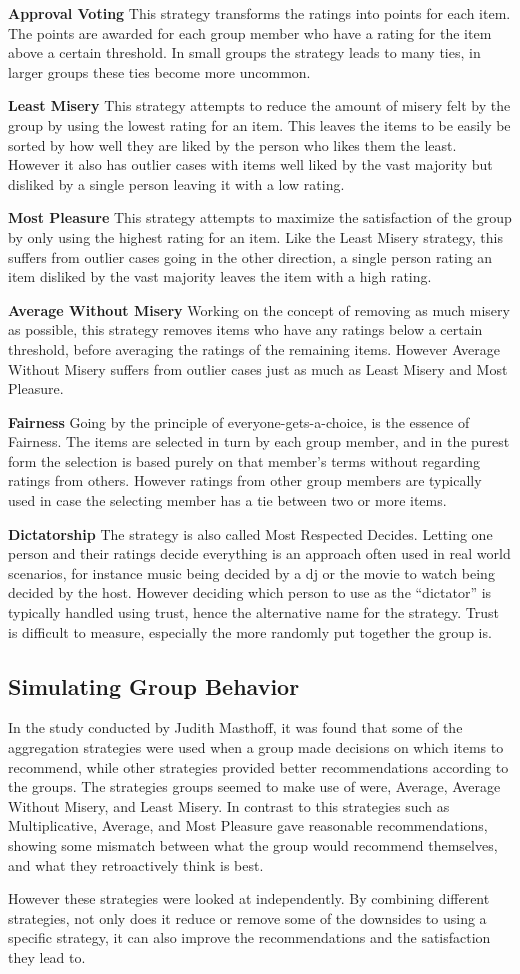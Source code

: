 \textbf{Approval Voting}
This strategy transforms the ratings into points for each item. The points are awarded for each group member who have a rating for the item above a certain threshold. In small groups the strategy leads to many ties, in larger groups these ties become more uncommon.

\textbf{Least Misery}
This strategy attempts to reduce the amount of misery felt by the group by using the lowest rating for an item. This leaves the items to be easily be sorted by how well they are liked by the person who likes them the least. However it also has outlier cases with items well liked by the vast majority but disliked by a single person leaving it with a low rating.

\textbf{Most Pleasure}
This strategy attempts to maximize the satisfaction of the group by only using the highest rating for an item. Like the Least Misery strategy, this suffers from outlier cases going in the other direction, a single person rating an item disliked by the vast majority leaves the item with a high rating.

\textbf{Average Without Misery}
Working on the concept of removing as much misery as possible, this strategy removes items who have any ratings below a certain threshold, before averaging the ratings of the remaining items. However Average Without Misery suffers from outlier cases just as much as Least Misery and Most Pleasure.

\textbf{Fairness}
Going by the principle of everyone-gets-a-choice, is the essence of Fairness. The items are selected in turn by each group member, and in the purest form the selection is based purely on that member's terms without regarding ratings from others. However ratings from other group members are typically used in case the selecting member has a tie between two or more items. 

\textbf{Dictatorship}
The strategy is also called Most Respected Decides. Letting one person and their ratings decide everything is an approach often used in real world scenarios, for instance music being decided by a dj or the movie to watch being decided by the host. However deciding which person to use as the “dictator” is typically handled using trust, hence the alternative name for the strategy. Trust is difficult to measure, especially the more randomly put together the group is.

\subsection{Simulating Group Behavior}
In the study conducted by Judith Masthoff, it was found that some of the aggregation strategies were used when a group made decisions on which items to recommend, while other strategies provided better recommendations according to the groups. The strategies groups seemed to make use of were, Average, Average Without Misery, and Least Misery. In contrast to this strategies such as Multiplicative, Average, and Most Pleasure gave reasonable recommendations, showing some mismatch between what the group would recommend themselves, and what they retroactively think is best.

However these strategies were looked at independently. By combining different strategies, not only does it reduce or remove some of the downsides to using a specific strategy, it can also improve the recommendations and the satisfaction they lead to.